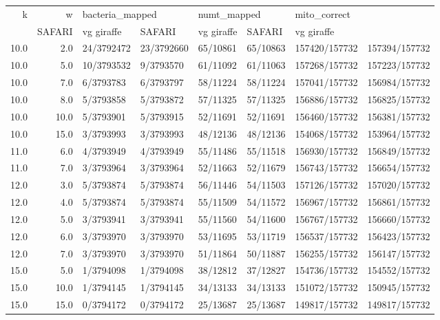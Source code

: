 \begin{tabular}{rrllllll}
\toprule
   k &    w & \multicolumn{2}{l}{bacteria\_mapped} & \multicolumn{2}{l}{numt\_mapped} & \multicolumn{2}{l}{mito\_correct} \\
     &          SAFARI & vg giraffe &      SAFARI & vg giraffe &        SAFARI &    vg giraffe \\
\midrule
10.0 &  2.0 &      24/3792472 & 23/3792660 &    65/10861 &   65/10863 & 157420/157732 & 157394/157732 \\
10.0 &  5.0 &      10/3793532 &  9/3793570 &    61/11092 &   61/11063 & 157268/157732 & 157223/157732 \\
10.0 &  7.0 &       6/3793783 &  6/3793797 &    58/11224 &   58/11224 & 157041/157732 & 156984/157732 \\
10.0 &  8.0 &       5/3793858 &  5/3793872 &    57/11325 &   57/11325 & 156886/157732 & 156825/157732 \\
10.0 & 10.0 &       5/3793901 &  5/3793915 &    52/11691 &   52/11691 & 156460/157732 & 156381/157732 \\
10.0 & 15.0 &       3/3793993 &  3/3793993 &    48/12136 &   48/12136 & 154068/157732 & 153964/157732 \\
11.0 &  6.0 &       4/3793949 &  4/3793949 &    55/11486 &   55/11518 & 156930/157732 & 156849/157732 \\
11.0 &  7.0 &       3/3793964 &  3/3793964 &    52/11663 &   52/11679 & 156743/157732 & 156654/157732 \\
12.0 &  3.0 &       5/3793874 &  5/3793874 &    56/11446 &   54/11503 & 157126/157732 & 157020/157732 \\
12.0 &  4.0 &       5/3793874 &  5/3793874 &    55/11509 &   54/11572 & 156967/157732 & 156861/157732 \\
12.0 &  5.0 &       3/3793941 &  3/3793941 &    55/11560 &   54/11600 & 156767/157732 & 156660/157732 \\
12.0 &  6.0 &       3/3793970 &  3/3793970 &    53/11695 &   53/11719 & 156537/157732 & 156423/157732 \\
12.0 &  7.0 &       3/3793970 &  3/3793970 &    51/11864 &   50/11887 & 156255/157732 & 156147/157732 \\
15.0 &  5.0 &       1/3794098 &  1/3794098 &    38/12812 &   37/12827 & 154736/157732 & 154552/157732 \\
15.0 & 10.0 &       1/3794145 &  1/3794145 &    34/13133 &   34/13133 & 151072/157732 & 150945/157732 \\
15.0 & 15.0 &       0/3794172 &  0/3794172 &    25/13687 &   25/13687 & 149817/157732 & 149817/157732 \\

\end{tabular}
